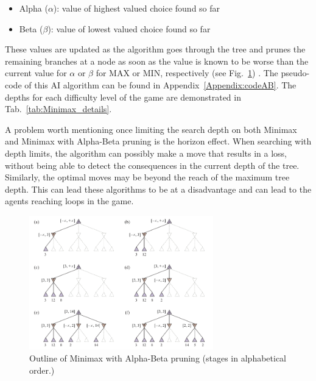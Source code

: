 \documentclass[journal]{IEEEtran}
\begin{document}
\begin{itemize}
  \item Alpha ($\alpha$): value of highest valued choice found so far
  \item Beta ($\beta$): value of lowest valued choice found so far
\end{itemize}

These values are updated as the algorithm goes through the tree and prunes the remaining branches at a node as soon as the value is known to be worse than the current value for $\alpha$ or $\beta$ for MAX or MIN, respectively (see Fig.~\ref{fig:alphabeta}) \cite{russell2020}. The pseudo-code of this AI algorithm can be found in Appendix~\ref{Appendix:codeAB}.
The depths for each difficulty level of the game are demonstrated in Tab.~\ref{tab:Minimax_details}. 

A problem worth mentioning once limiting the search depth on both Minimax and Minimax with Alpha-Beta pruning is the horizon effect. When searching with depth limits, the algorithm can possibly make a move that results in a loss, without being able to detect the consequences in the current depth of the tree. Similarly, the optimal moves may be beyond the reach of the maximum tree depth. This can lead these algorithms to be at a disadvantage and can lead to the agents reaching loops in the game.

\begin{figure}[h!]
    \centering
    \includegraphics[width = 8cm]{alphabeta}
    \caption{Outline of Minimax with Alpha-Beta pruning (stages in alphabetical  order.) \cite{russell2020}}
    \label{fig:alphabeta}
\end{figure}
\end{document}
